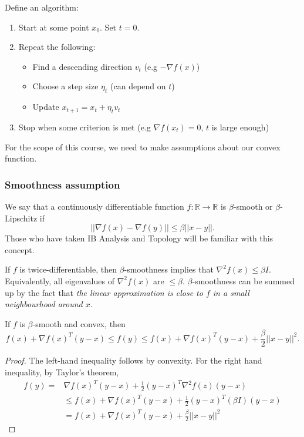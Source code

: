 \documentclass[a4paper]{scrartcl}
\begin{document}
\begin{definition}
	Define an algorithm:
	 \begin{enumerate}
		 \item Start at some point $x_0$. Set $t=0$.
		 \item Repeat the following: 
		 \begin{itemize}
			 \item Find a descending direction $v_t$ (e.g $-\nabla f(x)$)
			 \item Choose a step size $\eta_t$ (can depend on $t$)
			 \item Update $x_{t+1}=x_t+\eta_t v_t$
		 \end{itemize}
		 \item Stop when some criterion is met (e.g $\nabla f(x_t)=0$, $t$ is large enough)
	 \end{enumerate}
\end{definition}

For the scope of this course, we need to make assumptions about our convex function.
\subsubsection{Smoothness assumption}

\begin{definition}
	 We say that a continuously differentiable function $f: \mathbb{R} \rightarrow \mathbb{R}$ is $\beta$-smooth or $\beta$-Lipschitz if 
	 \[||\nabla f(x)-\nabla f(y)|| \leq \beta ||x-y||.\] 
	 Those who have taken IB Analysis and Topology will be familiar with this concept.
\end{definition}
\begin{remark}
	If $f$ is twice-differentiable, then $\beta$-smoothness implies that $\nabla^2 f(x)\leq \beta I$. Equivalently, all eigenvalues of $\nabla^2 f(x)$ are $\leq \beta$. $\beta$-smoothness can be summed up by the fact that \emph{the linear approximation is close to $f$ in a small neighbourhood around $x$}.
\end{remark}

\begin{proposition}
	If $f$ is $\beta$-smooth and convex, then 
	\[f(x)+\nabla f(x)^T(y-x) \leq f(y) \leq f(x)+\nabla f(x)^T(y-x)+ \frac{\beta}{2}||x-y||^2.\]
\end{proposition}

\begin{proof}
	 The left-hand inequality follows by convexity.\newline 
	 For the right hand inequality, by Taylor's theorem,
	 \begin{equation*}
		  \begin{split}
			  f(y)=&\nabla f(x)^T(y-x)+\frac{1}{2}(y-x)^T \nabla^2 f(z)(y-x)\\
			  &\leq f (x) +\nabla f (x)^T (y-x) + \frac{1}{2} (y-x)^T (\beta I)(y-x)\\
			  &=f(x)+\nabla f (x)^T (y-x) + \frac{\beta}{2} ||x-y||^2
		  \end{split}
	 \end{equation*}
\end{proof}
\end{document}
